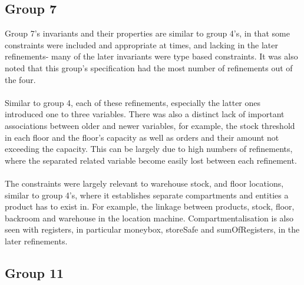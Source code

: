 \subsection{Group 7}
\label{group7}

Group 7’s invariants and their properties are similar to group 4’s, in that some constraints were included and appropriate at times, and lacking in the later refinements- many of the later invariants were type based constraints. It was also noted that this group’s specification had the most number of refinements out of the four.
 \\ \\ Similar to group 4, each of these refinements, especially the latter ones introduced one to three variables. There was also a distinct lack of important associations between older and newer variables, for example, the stock threshold in each floor and the floor’s capacity as well as orders and their amount not exceeding the capacity. This can be largely due to high numbers of refinements, where the separated related variable become easily lost between each refinement.
 \\ \\ The constraints were largely relevant to warehouse stock, and floor locations, similar to group 4’s, where it establishes separate compartments and entities a product has to exist in. For example, the linkage between products, stock, floor, backroom and warehouse in the location machine. Compartmentalisation is also seen with registers, in particular moneybox, storeSafe and sumOfRegisters, in the later refinements. 

\subsection{Group 11}
\label{group11}

